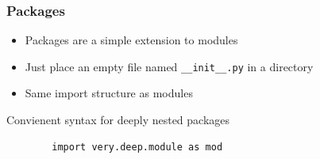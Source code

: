 \documentclass[11pt,professionalfonts]{beamer}
\begin{document}
\begin{frame}[fragile]\frametitle{Packages}
    \begin{itemize}
        \item Packages are a simple extension to modules
        \item Just place an empty file named \texttt{\_\_init\_\_.py} in a directory
        \item Same import structure as modules
    \end{itemize}

    Convienent syntax for deeply nested packages
    \begin{verbatim}
        import very.deep.module as mod
    \end{verbatim}
\end{frame}
\end{document}
